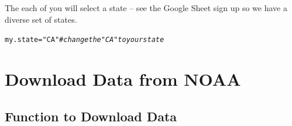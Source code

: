\documentclass{article}\usepackage[]{graphicx}\usepackage[]{xcolor}
\makeatletter
\newcommand{\hlstr}[1]{\textcolor[rgb]{0.192,0.494,0.8}{#1}}%
\newcommand{\hlcom}[1]{\textcolor[rgb]{0.678,0.584,0.686}{\textit{#1}}}%
\newcommand{\hlstd}[1]{\textcolor[rgb]{0.345,0.345,0.345}{#1}}%
\newcommand{\hlkwb}[1]{\textcolor[rgb]{0.69,0.353,0.396}{#1}}%
\newenvironment{kframe}{%
 \def\at@end@of@kframe{}%
 \ifinner\ifhmode%
  \def\at@end@of@kframe{\end{minipage}}%
  \begin{minipage}{\columnwidth}%
 \fi\fi%
 \def\FrameCommand##1{\hskip\@totalleftmargin \hskip-\fboxsep
 \colorbox{shadecolor}{##1}\hskip-\fboxsep
     \hskip-\linewidth \hskip-\@totalleftmargin \hskip\columnwidth}%
 \MakeFramed {\advance\hsize-\width
   \@totalleftmargin\z@ \linewidth\hsize
   \@setminipage}}%
 {\par\unskip\endMakeFramed%
 \at@end@of@kframe}
\newenvironment{knitrout}{}{} %
\makeatother
\begin{document}
The each of you will select a state -- see the Google Sheet sign up so we have a diverse set of states.

\begin{knitrout}
\color{fgcolor}\begin{kframe}
\begin{alltt}
\hlstd{my.state} \hlkwb{=} \hlstr{"CA"} \hlcom{# change the "CA" to your state}
\end{alltt}
\end{kframe}
\end{knitrout}

\section{Download Data from NOAA}

\subsection{Function to Download Data}
\end{document}
